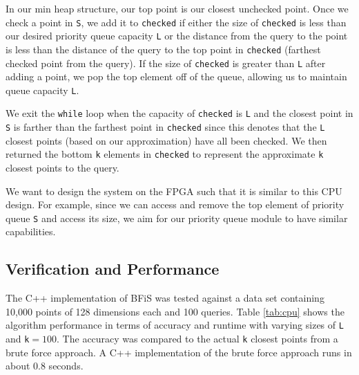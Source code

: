 \documentclass[conference]{IEEEtran}
\begin{document}
In our min heap structure, our top point is our closest unchecked point. Once we check a point in \texttt{S}, we add it to \texttt{checked} if either the size of \texttt{checked} is less than our desired priority queue capacity \texttt{L} or the distance from the query to the point is less than the distance of the query to the top point in \texttt{checked} (farthest checked point from the query). If the size of \texttt{checked} is greater than \texttt{L} after adding a point, we pop the top element off of the queue, allowing us to maintain queue capacity \texttt{L}. 

We exit the \texttt{while} loop when the capacity of \texttt{checked} is \texttt{L} and the closest point in \texttt{S} is farther than the farthest point in \texttt{checked} since this denotes that the \texttt{L} closest points (based on our approximation) have all been checked. We then returned the bottom \texttt{k} elements in \texttt{checked} to represent the approximate \texttt{k} closest points to the query.

We want to design the system on the FPGA such that it is similar to this CPU design. For example, since we can access and remove the top element of priority queue \texttt{S} and access its size, we aim for our priority queue module to have similar capabilities.

\subsection{Verification and Performance}

The C++ implementation of BFiS was tested against a data set containing 10,000 points of 128 dimensions each and 100 queries. Table \ref{tab:cpu} shows the algorithm performance in terms of accuracy and runtime with varying sizes of \texttt{L} and \texttt{k}$=100$. The accuracy was compared to the actual \texttt{k} closest points from a brute force approach. A C++ implementation of the brute force approach runs in about 0.8 seconds.

\begin{table}[hbt!]
\caption{Performance of BFiS (C++) on graph with 10,000 points}
\label{tab:cpu}
\end{table}
\end{document}
